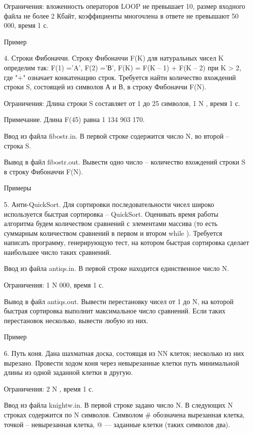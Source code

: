 \documentclass[]{article}
\begin{document}
Ограничения: вложенность операторов LOOP не превышает 10, размер входного файла не более 2 Кбайт, коэффициенты многочлена в ответе не превышают 50 000, время 1 с.

Пример



4. Строки Фибоначчи. Строку Фибоначчи F(K) для натуральных чисел K определим так: F(1) ='A', F(2) ='В', F(K) = F(K – 1) + F(K – 2) при K > 2, где "+" означает конкатенацию строк. Требуется найти количество вхождений строки S, состоящей из символов А и В, в строку Фибоначчи F(N).

Ограничения: Длина строки S составляет от 1 до 25 символов, 1 \leq N , время 1 с.

Примечание. Длина F(45) равна 1 134 903 170.

Ввод из файла fibostr.in. В первой строке содержится число N, во второй – строка S.

Вывод в файл fibostr.out. Вывести одно число – количество вхождений строки S в строку Фибоначчи F(N).

Примеры



5. Анти-QuickSort. Для сортировки последовательности чисел широко используется быстрая сортировка – QuickSort. Оценивать время работы алгоритма будем количеством сравнений с элементами массива (то есть суммарным количеством сравнений в первом и втором while ). Требуется написать программу, генерирующую тест, на котором быстрая сортировка сделает наибольшее число таких сравнений.

Ввод из файла antiqs.in. В первой строке находится единственное число N.

Ограничения: 1 \leq N  000, время 1 с.

Вывод в файл antiqs.out. Вывести перестановку чисел от 1 до N, на которой быстрая сортировка выполнит максимальное число сравнений. Если таких перестановок несколько, вывести любую из них.

Пример



6. Путь коня. Дана шахматная доска, состоящая из N\times N клеток; несколько из них вырезано. Провести ходом коня через невырезанные клетки путь минимальной длины из одной заданной клетки в другую.

Ограничения: 2 \leq N , время 1 с.

Ввод из файла knightw.in. В первой строке задано число N. В следующих N строках содержится по N символов. Символом # обозначена вырезанная клетка, точкой – невырезанная клетка, @ — заданные клетки (таких символов два).
\end{document}
